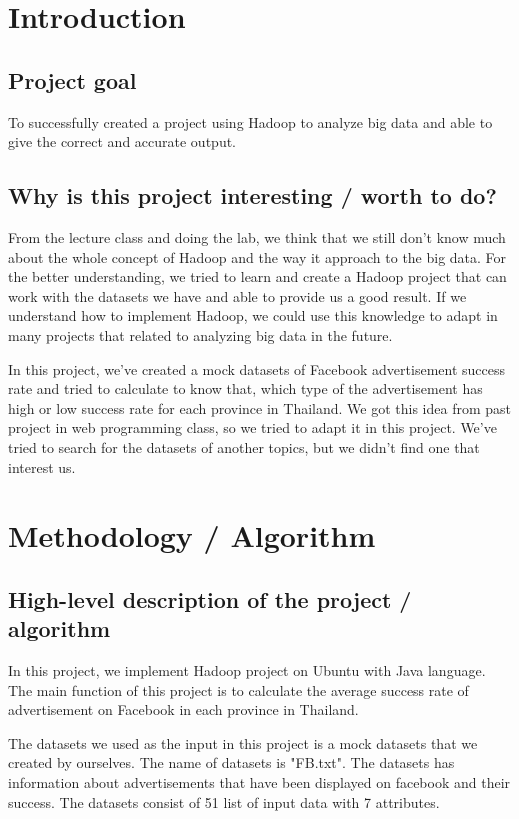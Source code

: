 \documentclass[11pt]{article}
\begin{document}
\section{Introduction}\label{sec:intro}
\subsection{Project goal}
To successfully created a project using Hadoop to analyze big data and able to give the correct and accurate output.
\subsection{Why is this project interesting / worth to do?}
From the lecture class and doing the lab, we think that we still don't know much about the whole concept of Hadoop and the way it approach to the big data. For the better understanding, we tried to learn and create a Hadoop project that can work with the datasets we have and able to provide us a good result. If we understand how to implement Hadoop, we could use this knowledge to adapt in many projects that related to analyzing big data in the future.

In this project, we've created a mock datasets of Facebook advertisement success rate and tried to calculate to know that, which type of the advertisement has high or low success rate for each province in Thailand. We got this idea from past project in web programming class, so we tried to adapt it in this project. We've tried to search for the datasets of another topics, but we didn't find one that interest us.


\newpage
\section{Methodology / Algorithm}\label{sec:method}
\subsection{High-level description of the project / algorithm}
In this project, we implement Hadoop project on Ubuntu with Java language. The main function of this project is to calculate the average success rate of advertisement on Facebook in each province in Thailand.

The datasets we used as the input in this project is a mock datasets that we created by ourselves. The name of datasets is "FB.txt". The datasets has information about advertisements that have been displayed on facebook and their success. The datasets consist of 51 list of input data with 7 attributes.
\end{document}
